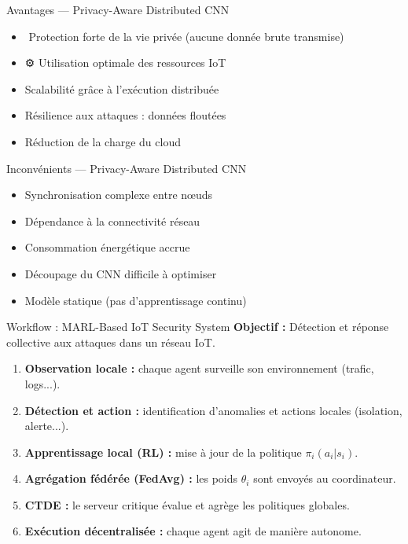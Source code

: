 \documentclass{beamer}
\begin{document}
\begin{frame}{Avantages — Privacy-Aware Distributed CNN}
\begin{itemize}
    \item ️ Protection forte de la vie privée (aucune donnée brute transmise)
    \item ⚙️ Utilisation optimale des ressources IoT
    \item  Scalabilité grâce à l’exécution distribuée
    \item  Résilience aux attaques : données floutées
    \item  Réduction de la charge du cloud
\end{itemize}
\end{frame}

\begin{frame}{Inconvénients — Privacy-Aware Distributed CNN}
\begin{itemize}
    \item  Synchronisation complexe entre nœuds
    \item  Dépendance à la connectivité réseau
    \item  Consommation énergétique accrue
    \item  Découpage du CNN difficile à optimiser
    \item  Modèle statique (pas d’apprentissage continu)
\end{itemize}
\end{frame}

\begin{frame}{Workflow : MARL-Based IoT Security System}
\textbf{Objectif :} Détection et réponse collective aux attaques dans un réseau IoT.
\begin{enumerate}
    \item \textbf{Observation locale :} chaque agent surveille son environnement (trafic, logs...).
    \item \textbf{Détection et action :} identification d’anomalies et actions locales (isolation, alerte...).
    \item \textbf{Apprentissage local (RL) :} mise à jour de la politique $\pi_i(a_i|s_i)$.
    \item \textbf{Agrégation fédérée (FedAvg) :} les poids $\theta_i$ sont envoyés au coordinateur.
    \item \textbf{CTDE :} le serveur critique évalue et agrège les politiques globales.
    \item \textbf{Exécution décentralisée :} chaque agent agit de manière autonome.
\end{enumerate}
\end{frame}
\end{document}
